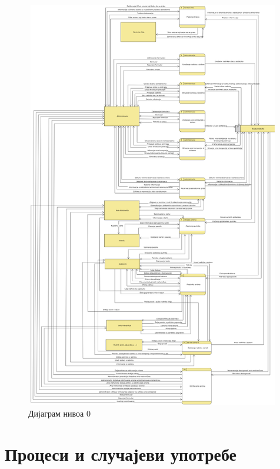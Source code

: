 \documentclass{article}
\begin{document}
\newpage 

\begin{figure}[H]
    \begin{center}
        \includegraphics[width=1.1\textwidth, height=18cm]{Dijagrami_slike/dijagram_nivoa_0.jpg}
        \caption{Дијаграм нивоа 0}
    \end{center}
\end{figure}


\section{Процеси и случајеви употребе}
\end{document}
